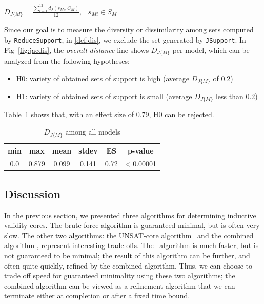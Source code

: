 \begin{definition}
  \label{def:dis}
  $D_{J\{M\}} =  \frac{\sum_{i=1}^{12}d_J(s_{Mi}, C_M)}{12},   \hspace{9pt} s_{Mi} \in S_M$
\end{definition}

Since our goal is to measure the diversity or dissimilarity among sets computed by \texttt{ReduceSupport}, in \ref{def:dis}, we exclude the set generated by \texttt{JSupport}. In Fig~\ref{fig:jacdis}, the \emph{overall distance} line shows $D_{J\{M\}}$ per model, which can be analyzed from the following hypotheses:
\begin{itemize}
  \item H0: variety of obtained sets of support is high (average $D_{J\{M\}}$ of 0.2)
  \item H1: variety of obtained sets of support is small (average $D_{J\{M\}}$ less than 0.2)
\end{itemize}
Table~\ref{tab:variety} shows that, with an effect size of 0.79, H0 can be rejected.
\begin{table}
  \centering
  \begin{tabular}{ |c|c|c|c|c|c| }
    \hline
     min & max & mean & stdev & ES & p-value\\[0.5ex]
    \hline
     0.0   & 0.879 & 0.099 & 0.141 & 0.72 & < 0.00001 \\[0.5ex]
    \hline
  \end{tabular}
  \caption{$D_{J\{M\}}$ among all models}
  \label{tab:variety}
\end{table}
\fi


\subsection{Discussion}

In the previous section, we presented three algorithms for determining inductive validity cores.  The brute-force algorithm is guaranteed minimal, but is often very slow.  The other two algorithms: the UNSAT-core algorithm \ucalg\ and the combined algorithm \ucbfalg, represent interesting trade-offs.  The \ucalg\ algorithm is much faster, but is not guaranteed to be minimal; the result of this algorithm can be further, and often quite quickly, refined by the combined algorithm.  Thus, we can choose to trade off speed for guaranteed minimality using these two algorithms; the combined algorithm can be viewed as a refinement algorithm that we can terminate either at completion or after a fixed time bound.


